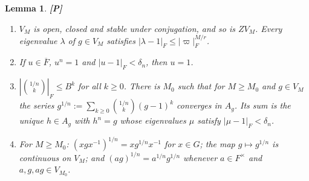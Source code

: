 \documentclass[12pt]{article}
\newcommand{\ov}[1]{\overline{#1}}
\newcommand{\Pv}{\textbf{[P]}}
\theoremstyle{plain}
\newtheorem{lemma}[theorem]{Lemma}
\theoremstyle{definition}
\begin{document}
\begin{lemma}\label{lem:roots}\Pv
\begin{enumerate}[label=(\alph*)]
\item $V_M$ is open, closed and stable under conjugation, and so is $ZV_M$. Every eigenvalue $\lambda$ of $g\in V_M$ satisfies $|\lambda-1|_F\le|\varpi|_F^{M/r}$.
\item If $u\in\ov F$, $u^n=1$ and $|u-1|_F<\delta_n$, then $u=1$.
\item $|\binom{1/n}{k}|_F\le B^k$ for all $k\ge0$. There is $M_0$ such that for $M\ge M_0$ and $g\in V_M$ the series $g^{1/n}:=\sum_{k\ge0}\binom{1/n}{k}(g-1)^k$ converges in $A_g$. Its sum is the unique $h\in A_g$ with $h^n=g$ whose eigenvalues $\mu$ satisfy $|\mu-1|_F<\delta_n$.
\item For $M\ge M_0$: $(xgx^{-1})^{1/n}=xg^{1/n}x^{-1}$ for $x\in G$; the map $g\mapsto g^{1/n}$ is continuous on $V_M$; and $(ag)^{1/n}=a^{1/n}g^{1/n}$ whenever $a\in F^\times$ and $a,g,ag\in V_{M_0}$.
\end{enumerate}
\end{lemma}
\end{document}
